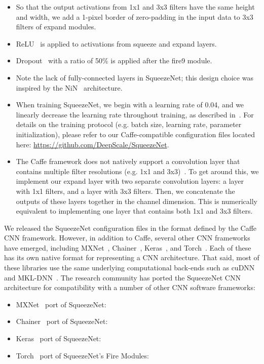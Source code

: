 \documentclass{article} \usepackage{iclr2017_conference,times}
\renewcommand{\cite}{\citep}
\begin{document}
\begin{itemize}
	\setlength\itemsep{0in} \item[]{So that the output activations from 1x1 and 3x3 filters have the same height and width, we add a 1-pixel border of zero-padding in the input data to 3x3 filters of expand modules.}
	\item[]{ReLU~\cite{ReLU} is applied to activations from squeeze and expand layers.}
	\item[]{Dropout~\cite{dropout} with a ratio of 50\% is applied after the fire9 module.}
	\item[]{Note the lack of fully-connected layers in SqueezeNet; this design choice was inspired by the NiN~\cite{NiN} architecture.}
\item[]{When training SqueezeNet, we begin with a learning rate of 0.04, and we linearly decrease the learning rate throughout training, as described in~\cite{linearLR}.
		For details on the training protocol (e.g. batch size, learning rate, parameter initialization), please refer to our Caffe-compatible configuration files located here: \href{https://github.com/DeepScale/SqueezeNet}{https://github.com/DeepScale/SqueezeNet}.}
	\item[]{The Caffe framework does not natively support a convolution layer that contains multiple filter resolutions (e.g. 1x1 and 3x3)~\cite{jia2014caffe}. To get around this, we implement our expand layer with two separate convolution layers: a layer with 1x1 filters, and a layer with 3x3 filters. Then, we concatenate the outputs of these layers together in the channel dimension. This is numerically equivalent to implementing one layer that contains both 1x1 and 3x3 filters.}
\end{itemize}

We released the SqueezeNet configuration files in the format defined by the Caffe CNN framework. 
However, in addition to Caffe, several other CNN frameworks have emerged, including MXNet~\cite{mxnet}, Chainer~\cite{chainer}, Keras~\cite{keras}, and Torch~\cite{torch}.
Each of these has its own native format for representing a CNN architecture.
That said, most of these libraries use the same underlying computational back-ends such as cuDNN~\cite{cuDNN} and MKL-DNN~\cite{IntelDistributedCNN}.
The research community has ported the SqueezeNet CNN architecture for compatibility with a number of other CNN software frameworks:
\begin{itemize}
	\item MXNet~\cite{mxnet} port of SqueezeNet:~\cite{mxnet-squeezenet}
	
	\item Chainer~\cite{chainer} port of SqueezeNet:~\cite{chainer-squeezenet}
	
	\item Keras~\cite{keras} port of SqueezeNet:~\cite{keras-squeezenet}
	
	\item Torch~\cite{torch} port of SqueezeNet's Fire Modules:~\cite{torch-squeezenet}


\end{itemize}
\end{document}
